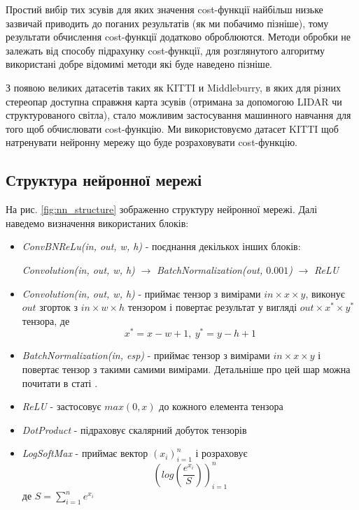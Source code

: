 \documentclass{article}
\theoremstyle{definition}
\begin{document}
Простий вибір тих зсувів для яких значення cost-функції найбільш низьке зазвичай приводить до поганих результатів (як ми побачимо пізніше), тому результати обчислення cost-функції додатково оброблюются. Методи обробки не залежать від способу підрахунку cost-функції, для розглянутого алгоритму використані добре відомимі методи які буде наведено пізніше.

З появою великих датасетів таких як KITTI и Middleburry, в яких для різних стереопар доступна справжня карта зсувів (отримана за допомогою LIDAR чи структурованого світла), стало можливим застосування машинного навчання для того щоб обчислювати cost-функцію. Ми використовуємо датасет KITTI щоб натренувати нейронну мережу що буде розраховувати cost-функцію.

\subsection{Структура нейронної мережі}
На рис. \ref{fig:nn_structure} зображенно структуру нейронної мережі. Далі наведемо визначення використаних блоків:
\begin{itemize}
	\item \textit{ConvBNReLu(in, out, w, h)} - поєднання декількох інших блоків: 
	
	\textit{Convolution(in, out, w, h)} $\to$ \textit{BatchNormalization(out, $0.001$)} $\to$ \textit{ReLU}
	
	\item \textit{Convolution(in, out, w, h)} - приймає тензор з вимірами $in \times x \times y$, виконує $out$ згорток з $in \times w \times h$ тензором і повертає результат у вигляді $out \times x^* \times y^*$ тензора, де 
	\[ x^* = x - w + 1, \  y^* = y - h + 1 \]
	
	\item \textit{BatchNormalization(in, esp)} - приймає тензор з вимірами $in \times x \times y$ і повертає тензор з такими самими вимірами. Детальніше про цей шар можна почитати в статі \cite{ioffe2015batch}.
	
	\item \textit{ReLU} - застосовує $max(0, x)$ до кожного елемента тензора
	
	\item \textit{DotProduct} - підраховує скалярний добуток тензорів
	
	\item \textit{LogSoftMax} - приймає вектор $(x_i)_{i=1}^n$ і розраховує 
	\[ \left( log\left( \frac{e^{x_i}}{S} \right) \right)_{i=1}^n \]
	де $S = \sum_{i=1}^n e^{x_i}$
\end{itemize}
\end{document}
